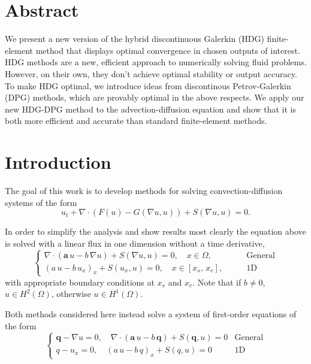 \documentclass[12pt,letter]{article}
\newcommand{\mbf}[1]{\mathbf{#1}}
\begin{document}
\section{Abstract}
We present a new version of the hybrid discontinuous Galerkin (HDG)
finite-element method that displays optimal convergence in chosen
outputs of interest. HDG methods are a new, efficient approach to
numerically solving fluid problems. However, on their own, they don't
achieve optimal stability or output accuracy. To make HDG optimal, we
introduce ideas from discontinous Petrov-Galerkin (DPG) methods, which
are provably optimal in the above respects. We apply our new HDG-DPG
method to the advection-diffusion equation and show that it is both
more efficient and accurate than standard finite-element methods.

\section{Introduction}

The goal of this work is to develop methods for solving
convection-diffusion systems of the form
\begin{equation*}
u_t + \nabla \cdot \left( F(u) - G(\nabla u,u)\right) + S(\nabla u, u) = 0.
\end{equation*}

In order to simplify the analysis and show results most clearly the
equation above is solved with a linear flux in one dimension without a
time derivative,
%
\begin{equation}
\begin{cases}
  \nabla \cdot \left( \mbf{a}\,u - b\,\nabla u \right) + S(\nabla u,u) = 0,\quad x \in \Omega,\qquad &\mathrm{General} \\
  (a\,u - b\,u_x)_x + S(u_x,u) = 0,\quad x \in [x_s,\,x_e],\qquad &\mathrm{1D}
\end{cases}
\end{equation}
%
with appropriate boundary conditions at $x_s$ and $x_e$.  Note that if
$b \ne 0$, $u\in H^2(\Omega)$, otherwise $u\in H^1(\Omega)$.

Both methods considered here instead solve a system of first-order
equations of the form
%
\begin{equation*}
\begin{cases}
  \mbf{q} - \nabla u = 0,\quad \nabla \cdot (\mbf{a}\,u - b\,\mbf{q}) + S(\mbf{q},u) = 0 &\mathrm{General} \\
  q-u_x=0,\quad (a\,u-b\,q)_x + S(q,u) = 0 &\mathrm{1D}
\end{cases}
\end{equation*}
%
\end{document}
